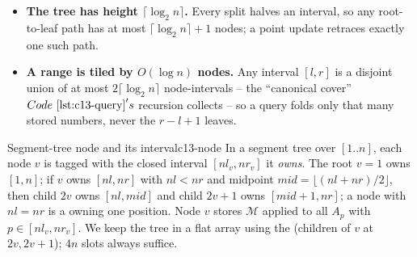 \begin{itemize}[nosep,leftmargin=1.4em]
  \item \textbf{The tree has height \(\lceil\log_2 n\rceil\).}  Every split
        halves an interval, so any root-to-leaf path has at most
        \(\lceil\log_2 n\rceil+1\) nodes; a point update retraces exactly one
        such path.
  \item \textbf{A range is tiled by \(O(\log n)\) nodes.}  Any interval
        \([l,r]\) is a disjoint union of at most \(2\lceil\log_2 n\rceil\)
        node-intervals -- the ``canonical cover'' \(\coderef{c13-query}'s\)
        recursion collects -- so a query folds only that many stored numbers,
        never the \(r-l+1\) leaves.
\end{itemize}

\begin{definition}{Segment-tree node and its interval}{c13-node}
In a segment tree over \([1..n]\), each node \(v\) is tagged with the closed
interval \([nl_v, nr_v]\) it \emph{owns}.  The root \(v=1\) owns \([1,n]\); if
\(v\) owns \([nl,nr]\) with \(nl<nr\) and midpoint \(mid=\lfloor(nl+nr)/2\rfloor\),
then child \(2v\) owns \([nl,mid]\) and child \(2v+1\) owns \([mid+1,nr]\); a
node with \(nl=nr\) is a  owning one position.  Node \(v\) stores
\(\mathcal{M}\) applied to all \(A_p\) with \(p\in[nl_v,nr_v]\).  We keep the
tree in a flat array  using the  (children of \(v\)
at \(2v,2v{+}1\)); \(4n\) slots always suffice.
\end{definition}

